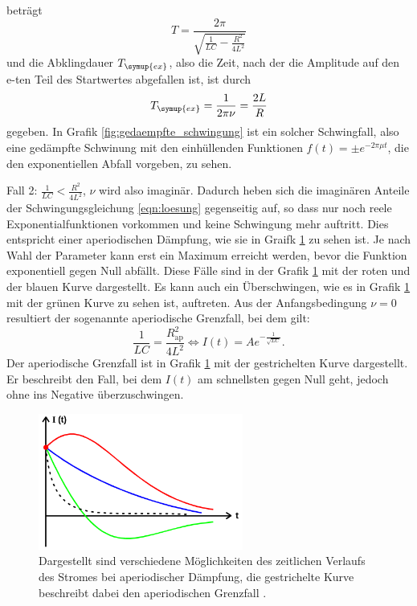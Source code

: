 beträgt
\begin{equation}
  T = \frac{2\pi}{\sqrt{\frac{1}{L C}-\frac{R^2}{4 L^2}}}
  \label{eqn:periode}
\end{equation}
und die Abklingdauer $T_\symup{ex}$, also die Zeit, nach der die Amplitude auf den
e-ten Teil des Startwertes abgefallen ist, ist durch
\begin{equation}
  T_\symup{ex} = \frac{1}{2\pi\nu} = \frac{2L}{R}
  \label{eqn:abklingzeit}
\end{equation}
gegeben. In Grafik \ref{fig:gedaempfte_schwingung} ist ein solcher Schwingfall,
also eine gedämpfte Schwinung mit den einhüllenden Funktionen $f(t)=\pm e^{-2\pi\mu t}$,
die den exponentiellen Abfall vorgeben, zu sehen.


Fall 2: $\frac{1}{L C} < \frac{R^2}{4L^2}$, $\nu$ wird also imaginär. Dadurch heben
sich die imaginären Anteile der Schwingungsgleichung \eqref{eqn:loesung} gegenseitig
auf, so dass nur noch reele Exponentialfunktionen vorkommen und keine Schwingung
mehr auftritt. Dies entspricht einer aperiodischen Dämpfung, wie sie in Graifk
\ref{fig:ap_grenzfall} zu sehen ist. Je nach Wahl der Parameter kann erst ein Maximum
erreicht werden, bevor die Funktion exponentiell gegen Null abfällt. Diese Fälle
sind in der Grafik \ref{fig:ap_grenzfall} mit der roten und der blauen Kurve
dargestellt. Es kann auch ein Überschwingen, wie es in Grafik \ref{fig:ap_grenzfall}
mit der grünen Kurve zu sehen ist, auftreten.
Aus der Anfangsbedingung $\nu=0$ resultiert der sogenannte aperiodische Grenzfall,
bei dem gilt:
\begin{equation}
  \frac{1}{L C} = \frac{R_{\text{ap}}^2}{4 L^2} \iff I(t) = A e^{-\frac{1}{\sqrt{L C}}}.
  \label{eqn:bedingung-ap-grenzfall}
\end{equation}
Der aperiodische Grenzfall ist in Grafik \ref{fig:ap_grenzfall} mit der gestrichelten
Kurve dargestellt. Er beschreibt den Fall, bei dem $I(t)$ am schnellsten gegen Null
geht, jedoch ohne ins Negative überzuschwingen.
\begin{figure}
  \centering
  \includegraphics[width=0.6\textwidth]{ap_grenzfall.png}
  \caption{Dargestellt sind verschiedene Möglichkeiten des zeitlichen Verlaufs des
  Stromes bei aperiodischer Dämpfung, die gestrichelte Kurve beschreibt dabei den
  aperiodischen Grenzfall \cite{sample}.}
  \label{fig:ap_grenzfall}
\end{figure}

